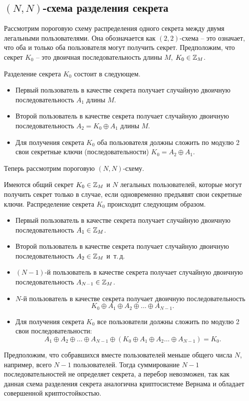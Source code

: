 \subsection[(N, N)-схема]{$(N, N)$-схема разделения секрета}

Рассмотрим пороговую схему распределения одного секрета между двумя легальными пользователями. Она обозначается как $(2, 2)$-схема -- это означает, что оба и только оба пользователя могут получить секрет. Предположим, что секрет $K_{0}$ -- это двоичная последовательность длины $M$, $K_{0} \in \mathbb{Z}_{M}$.

Разделение секрета $K_{0}$ состоит в следующем.
\begin{itemize}
    \item Первый пользователь в качестве секрета получает случайную двоичную последовательность $A_{1}$ длины $M$.
    \item Второй пользователь в качестве секрета получает случайную двоичную последовательность $A_{2} =K_{0} \oplus A_{1}$ длины $M$.
    \item Для получения секрета $K_{0}$ оба пользователя должны сложить по модулю 2 свои секретные ключи (последовательности)  $K_{0} = A_{2} \oplus A_{1}$.
\end{itemize}

Теперь рассмотрим пороговую $(N,N)$-схему.

Имеются общий секрет $K_{0} \in \mathbb{Z}_{M}$ и $N$ легальных пользователей, которые могут получить секрет только в случае, если одновременно предъявят свои секретные ключи. Распределение секрета $K_{0}$ происходит следующим образом.

\begin{itemize}
    \item Первый пользователь в качестве секрета получает случайную двоичную последовательность $A_{1} \in \mathbb{Z}_{M}$.
    \item Второй пользователь в качестве секрета получает случайную двоичную последовательность $A_{2} \in \mathbb{Z}_{M}$ и~т.\,д.
    \item $(N-1)$-й пользователь в качестве секрета получает случайную двоичную последовательность $A_{N-1} \in \mathbb{Z}_{M}$.
    \item $N$-й пользователь в качестве секрета получает двоичную последовательность
        \[ K_0 \oplus A_1 \oplus A_2 \oplus \dots \oplus A_{N-1}. \]
    \item Для получения секрета $K_0$ все пользователи должны сложить по модулю 2 свои последовательности:
        \[ A_1 \oplus A_2 \oplus \dots \oplus A_{N-1} \oplus (K_0 \oplus A_1 \oplus A_2 \dots \oplus A_{N-1}) = K_0. \]
\end{itemize}

Предположим, что собравшихся вместе пользователей меньше общего числа $N$, например, всего $N-1$ пользователей. Тогда суммирование $N-1$ последовательностей не определяет секрета, а перебор невозможен, так как данная схема разделения секрета аналогична криптосистеме Вернама и обладает совершенной криптостойкостью.
